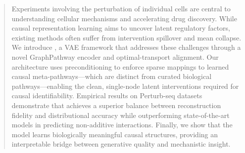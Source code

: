 \documentclass{article}
\begin{document}

\printAffiliationsAndNotice{}  %

\glsresetall

\begin{abstract}
Experiments involving the perturbation of individual cells are central to understanding cellular mechanisms and accelerating drug discovery. 
While causal representation learning aims to uncover latent regulatory factors, existing methods often suffer from intervention spillover and mean collapse. 
We introduce , a VAE framework that addresses these challenges through a novel GraphPathway encoder and optimal-transport alignment. 
Our architecture uses preconditioning to enforce sparse mappings to learned causal meta-pathways—which are distinct from curated biological pathways—enabling the clean, single-node latent interventions required for causal identifiability. 
Empirical results on Perturb-seq datasets demonstrate that  achieves a superior balance between reconstruction fidelity and distributional accuracy while outperforming state-of-the-art models in predicting non-additive interactions. 
Finally, we show that the model learns biologically meaningful causal structures, providing an interpretable bridge between generative quality and mechanistic insight.
\end{abstract}
\end{document}
